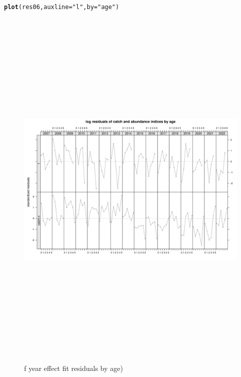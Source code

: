 \documentclass[a4paper,english,11pt]{article}\usepackage[]{graphicx}\usepackage[]{xcolor}
\makeatletter
\newcommand{\hlsng}[1]{\textcolor[rgb]{0.192,0.494,0.8}{#1}}%
\newcommand{\hldef}[1]{\textcolor[rgb]{0.345,0.345,0.345}{#1}}%
\newcommand{\hlkwc}[1]{\textcolor[rgb]{0.333,0.667,0.333}{#1}}%
\newcommand{\hlkwd}[1]{\textcolor[rgb]{0.737,0.353,0.396}{\textbf{#1}}}%
\newenvironment{kframe}{%
 \def\at@end@of@kframe{}%
 \ifinner\ifhmode%
  \def\at@end@of@kframe{\end{minipage}}%
  \begin{minipage}{\columnwidth}%
 \fi\fi%
 \def\FrameCommand##1{\hskip\@totalleftmargin \hskip-\fboxsep
 \colorbox{shadecolor}{##1}\hskip-\fboxsep
     \hskip-\linewidth \hskip-\@totalleftmargin \hskip\columnwidth}%
 \MakeFramed {\advance\hsize-\width
   \@totalleftmargin\z@ \linewidth\hsize
   \@setminipage}}%
 {\par\unskip\endMakeFramed%
 \at@end@of@kframe}
\newenvironment{knitrout}{}{} %
\makeatother
\begin{document}
\begin{knitrout}
\color{fgcolor}\begin{kframe}
\begin{alltt}
\hlkwd{plot}\hldef{(res06,} \hlkwc{auxline} \hldef{=} \hlsng{"l"}\hldef{,} \hlkwc{by} \hldef{=} \hlsng{"age"}\hldef{)}
\end{alltt}
\end{kframe}\begin{figure}[H]

{\centering \includegraphics[width=25cm,height=18cm,angle=90]{figure/n1resbyage-1} 

}

\caption[f year effect fit residuals by age)]{f year effect fit residuals by age)}\label{fig:n1resbyage}
\end{figure}

\end{knitrout}
\end{document}
